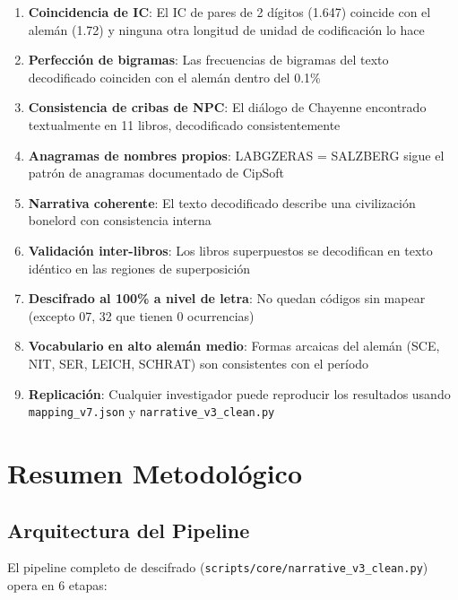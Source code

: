 \documentclass[11pt,a4paper]{article}
\begin{document}
\begin{enumerate}
\item \textbf{Coincidencia de IC}: El IC de pares de 2 d\'{i}gitos (1.647) coincide con el alem\'{a}n (1.72) y ninguna otra longitud de unidad de codificaci\'{o}n lo hace
\item \textbf{Perfecci\'{o}n de bigramas}: Las frecuencias de bigramas del texto decodificado coinciden con el alem\'{a}n dentro del 0.1\%
\item \textbf{Consistencia de cribas de NPC}: El di\'{a}logo de Chayenne encontrado textualmente en 11 libros, decodificado consistentemente
\item \textbf{Anagramas de nombres propios}: LABGZERAS = SALZBERG sigue el patr\'{o}n de anagramas documentado de CipSoft
\item \textbf{Narrativa coherente}: El texto decodificado describe una civilizaci\'{o}n bonelord con consistencia interna
\item \textbf{Validaci\'{o}n inter-libros}: Los libros superpuestos se decodifican en texto id\'{e}ntico en las regiones de superposici\'{o}n
\item \textbf{Descifrado al 100\% a nivel de letra}: No quedan c\'{o}digos sin mapear (excepto 07, 32 que tienen 0 ocurrencias)
\item \textbf{Vocabulario en alto alem\'{a}n medio}: Formas arcaicas del alem\'{a}n (SCE, NIT, SER, LEICH, SCHRAT) son consistentes con el per\'{i}odo
\item \textbf{Replicaci\'{o}n}: Cualquier investigador puede reproducir los resultados usando \texttt{mapping\_v7.json} y \texttt{narrative\_v3\_clean.py}
\end{enumerate}

\section{Resumen Metodol\'{o}gico}

\subsection{Arquitectura del Pipeline}

El pipeline completo de descifrado (\texttt{scripts/core/narrative\_v3\_clean.py}) opera en 6 etapas:
\end{document}
